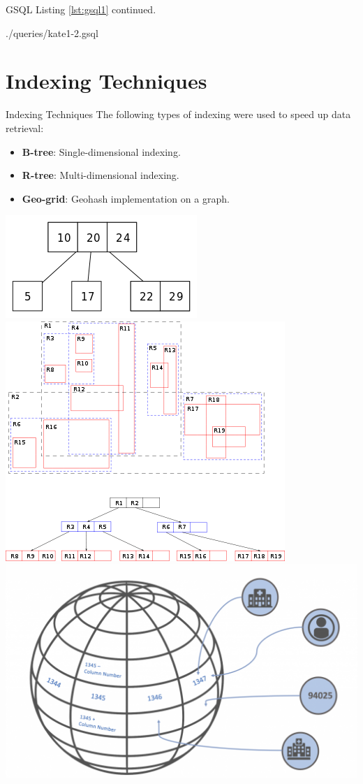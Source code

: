 \begin{frame}{GSQL}
    Listing \ref{lst:gsql1} continued.

    {./queries/kate1-2.gsql}
\end{frame}

\section{Indexing Techniques}

\begin{frame}{Indexing Techniques}
    The following types of indexing were used to speed up data retrieval:
    \vfill
    \begin{itemize}
        \item \textbf{B-tree}: Single-dimensional indexing.
        \item \textbf{R-tree}: Multi-dimensional indexing.
        \item \textbf{Geo-grid}: Geohash implementation on a graph.
    \end{itemize}
    \vfill
    \includegraphics[width=.25\textwidth]{img/index/btree.png}
    \hfill
    \includegraphics[width=.35\textwidth]{img/index/400px-R-tree.png}
    \hfill
    \includegraphics[width=.35\textwidth]{img/index/geogrid.png}
\end{frame}

